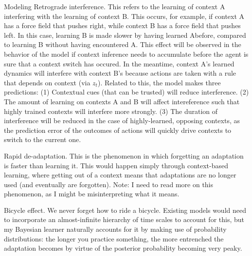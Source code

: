 \documentclass{report}
\begin{document}
\begin{chapter}{Modeling}
Retrograde interference. This refers to the learning of context A interfering
with the learning of context B. This occurs, for example, if context A has a
force field that pushes right, while context B has a force field that pushes
left. In this case, learning B is made slower by having learned Abefore,
compared to learning B without having encountered A. This effect will be
observed in the behavior of the model if context inference needs to accumulate
before the agent is sure that a context switch has occured. In the meantime,
context A's learned dynamics will interfere with context B's because actions are
taken with a rule that depends on context (via $z_t$). Related to this, the
model makes three predictions: (1) Contextual cues (that can be trusted) will
reduce interference. (2) The amount of learning on contexts A and B will affect
intereference such that highly trained contexts will interfere more
strongly. (3) The duration of interference will be reduced in the case of
highly-learned, opposing contexts, as the prediction error of the outcomes of
actions will quickly drive contexts to switch to the current one.

Rapid de-adaptation. This is the phenomenon in which forgetting an adaptation is
faster than learning it. This would happen simply through context-based
learning, where getting out of a context means that adaptations are no longer
used (and eventually are forgotten). Note: I need to read more on this
phenomenon, as I might be misinterpreting what it means.

Bicycle effect. We never forget how to ride a bicycle. Existing models would
need to incorporate an almost-infinite hierarchy of time scales to account for
this, but my Bayesian learner naturally accounts for it by making use of
probability distributions: the longer you practice something, the more
entrenched the adaptation becomes by virtue of the posterior probability
becoming very peaky.


\end{chapter}

\end{document}
